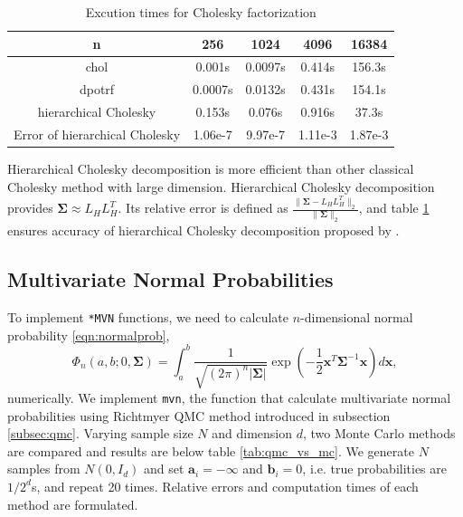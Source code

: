 \begin{table}[!h]
	\centering
	{
		\begin{tabular}{@{}ccccc@{}}
			\toprule
			n & 256 & 1024 & 4096 & 16384 \\ \midrule
			chol & 0.001s & 0.0097s & 0.414s & 156.3s \\
			dpotrf & 0.0007s & 0.0132s & 0.431s & 154.1s \\
			hierarchical Cholesky & 0.153s & 0.076s & 0.916s & 37.3s \\
			Error of hierarchical Cholesky & 1.06e-7 & 9.97e-7 & 1.11e-3 & 1.87e-3 \\  \bottomrule
		\end{tabular}%
	}
	\caption{Excution times for Cholesky factorization}
	\label{tab:table1}
\end{table}
Hierarchical Cholesky decomposition is more efficient than other classical Cholesky method with large dimension. Hierarchical Cholesky decomposition provides $\boldsymbol{\Sigma}\approx L_HL_H^T$. Its relative error is defined as $\frac{\lVert\boldsymbol{\Sigma}-L_HL_H^T\rVert_2}{\lVert\boldsymbol{\Sigma}\rVert_2}$, and table \ref{tab:table1} ensures accuracy of hierarchical Cholesky decomposition proposed by \citet{hackbusch2015hierarchical}.


\subsection{Multivariate Normal Probabilities} 

To implement \texttt{*MVN} functions, we need to calculate $n$-dimensional normal probability \eqref{eqn:normalprob},
$$
\Phi_n(a, b; 0, \boldsymbol{\Sigma}) = \int_a^b \frac{1}{\sqrt{(2\pi)^n |\boldsymbol{\Sigma}|}} \exp\left( -\frac{1}{2} \mathbf{x}^T \boldsymbol{\Sigma}^{-1} \mathbf{x} \right) d\mathbf{x},
$$ 
numerically. We implement \texttt{mvn}, the function that calculate multivariate normal probabilities using Richtmyer QMC method introduced in subsection \ref{subsec:qmc}. Varying sample size $N$ and dimension $d$, two Monte Carlo methods are compared and results are below table \ref{tab:qmc_vs_mc}. We generate $N$ samples from $N(0, I_d)$ and set $\mathbf{a}_i = -\infty$ and $\mathbf{b}_i = 0$, i.e. true probabilities are $1/2^d$s, and repeat 20 times. Relative errors and computation times of each method are formulated.

